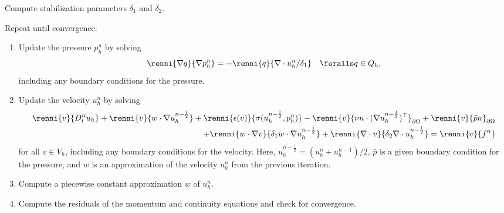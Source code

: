 {
  \item
    Compute stabilization parameters $\delta_1$ and $\delta_2$.

  \item
    Repeat until convergence:

    \begin{enumerate}
    \item
      Update the pressure $p^n_h$ by solving
      \begin{equation}\label{eq:g2_scheme,1}
        \renni{\nabla q}{\nabla p_h^n} = - \renni{q}{\nabla \cdot u_h^n/\delta_1}
        \quad \foralls q \in Q_h,
      \end{equation}
      including any boundary conditions for the pressure.

    \item
      Update the velocity $u^n_h$ by solving
      \begin{equation}\label{eq:g2_scheme,2}
        \begin{split}
          \renni{v}{D_t^n u_h}
          + \renni{v}{w \cdot \nabla u_h^{n-\frac{1}{2}}}
          + \renni{\epsilon(v)}{\sigma(u_h^{n-\frac{1}{2}}, p_h^n)}
          - \renni{v}{\nu n \cdot (\nabla u_h^{n-\frac{1}{2}})^{\top}}_{\partial\Omega}
          + \renni{v}{\bar{p} n}_{\partial\Omega} \\
          + \renni{w \cdot \nabla v}{\delta_1 w \cdot \nabla u_h^{n-\frac{1}{2}}}
          + \renni{\nabla \cdot v}{\delta_2 \nabla \cdot u_h^{n-\frac{1}{2}}}
          = \renni{v}{f^n}
        \end{split}
      \end{equation}
      for all $v \in V_h$, including any boundary conditions for the
      velocity. Here, $u_h^{n-\frac{1}{2}} = (u_h^n + u_h^{n-1}) / 2$,
      $\bar{p}$ is a given boundary condition for the pressure, and
      $w$ is an approximation of the velocity $u^n_h$ from the
      previous iteration.

    \item
      Compute a piecewise constant approximation $w$ of $u^n_h$.

    \item
      Compute the residuals of the momentum and continuity equations
      and check for convergence.

    \end{enumerate}
}


